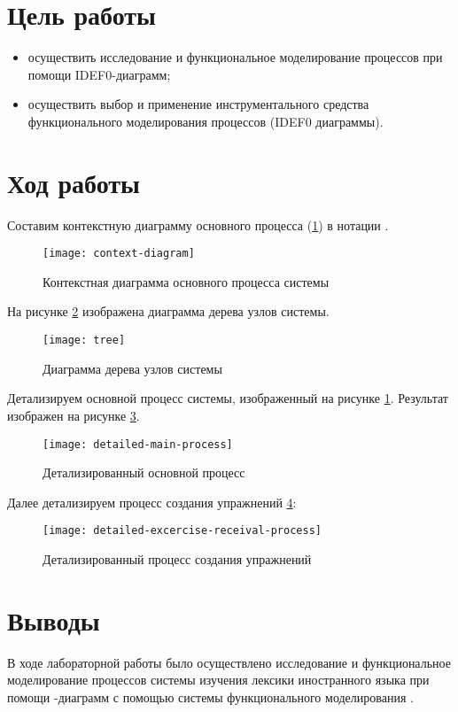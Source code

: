 \documentclass[a4paper,14pt]{extarticle}
\begin{document}


\section{Цель работы}
\begin{itemize}
    \item осуществить исследование и функциональное моделирование процессов при
          помощи IDEF0-диаграмм;
    \item осуществить выбор и применение инструментального средства
          функционального моделирования процессов (IDEF0 диаграммы).
\end{itemize}

\section{Ход работы}
Составим контекстную диаграмму основного процесса (\ref{fig:context-diagram}) в
нотации .

\begin{figure}[H]
    \centering
    \texttt{[image: context-diagram]}
    \caption{Контекстная диаграмма основного процесса системы}
    \label{fig:context-diagram}
\end{figure}

На рисунке \ref{fig:tree} изображена диаграмма дерева узлов системы.
\begin{figure}[H]
    \centering
    \texttt{[image: tree]}
    \caption{Диаграмма дерева узлов системы}
    \label{fig:tree}
\end{figure}

Детализируем основной процесс системы, изображенный на рисунке
\ref{fig:context-diagram}. Результат изображен на рисунке \ref{fig:detailed-main-process}.

\begin{figure}[H]
    \centering
    \texttt{[image: detailed-main-process]}
    \caption{Детализированный основной процесс}
    \label{fig:detailed-main-process}
\end{figure}

Далее детализируем процесс создания упражнений \ref{fig:detailed-excercise-receival-process}:
\begin{figure}[H]
    \centering
    \texttt{[image: detailed-excercise-receival-process]}
    \caption{Детализированный процесс создания упражнений}
    \label{fig:detailed-excercise-receival-process}
\end{figure}

\section*{Выводы}
В ходе лабораторной работы было осуществлено исследование и функциональное
моделирование процессов системы изучения лексики иностранного языка при помощи
-диаграмм с помощью системы функционального моделирования
.
\end{document}
